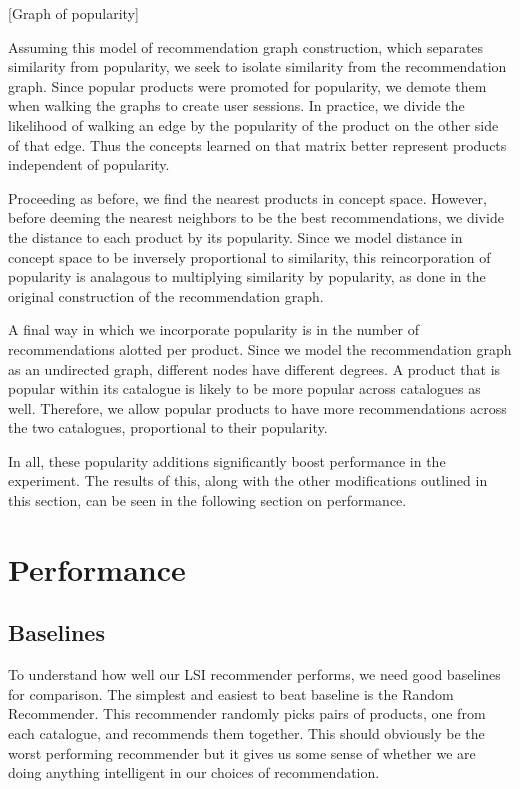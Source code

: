 \documentclass[11pt]{article}
\begin{document}
[Graph of popularity]

Assuming this model of recommendation graph construction, which separates similarity
from popularity, we seek to isolate similarity from the recommendation graph. Since
popular products were promoted for popularity, we demote them when walking the
graphs to create user sessions. In practice, we divide the likelihood of walking
an edge by the popularity of the product on the other side of that edge. Thus
the concepts learned on that matrix better represent products independent of
popularity. 

Proceeding as before, we find the nearest products in concept space. However,
before deeming the nearest neighbors to be the best recommendations, we divide
the distance to each product by its popularity. Since we model distance in 
concept space to be inversely proportional to similarity, this reincorporation
of popularity is analagous to multiplying similarity by popularity, as done in
the original construction of the recommendation graph.

A final way in which we incorporate popularity is in the number of
recommendations alotted per product. Since we model the recommendation graph as an
undirected graph, different nodes have different degrees. A product that is
popular within its catalogue is likely to be more popular across catalogues as
well. Therefore, we allow popular products to have more recommendations across
the two catalogues, proportional to their popularity.

In all, these popularity additions significantly boost performance in the
experiment. The results of this, along with the other modifications outlined in
this section, can be seen in the following section on performance.

\section*{Performance}
\subsection*{Baselines}
To understand how well our LSI recommender performs, we need good baselines
for comparison.  The simplest and easiest to beat baseline is the Random 
Recommender. This recommender randomly picks pairs of products, one from 
each catalogue, and recommends them together. This should obviously be the 
worst performing recommender but it gives us some sense of whether we are 
doing anything intelligent in our choices of recommendation.
\end{document}
